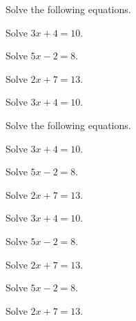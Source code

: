 \documentclass{worksheet}
\begin{document}
\begin{linebreak}
\end{linebreak}

\begin{question}
    Solve the following equations.
    \begin{parts}
        \begin{questionpart}
            Solve \(3x+4=10\).
        \end{questionpart}
        \begin{questionpart}
            Solve \(5x-2=8\).
        \end{questionpart}
        \begin{questionpart}
            Solve \(2x+7=13\).
        \end{questionpart}
        \begin{questionpart}
            Solve \(3x+4=10\).
        \end{questionpart}
    \end{parts}
\end{question}

\begin{pagebreak}
\end{pagebreak}

\begin{question}
    Solve the following equations.
    \begin{parts}[columns=3]
        \begin{questionpart}
            Solve \(3x+4=10\).
        \end{questionpart}
        \begin{questionpart}
            Solve \(5x-2=8\).
        \end{questionpart}
        \begin{questionpart}
            Solve \(2x+7=13\).
        \end{questionpart}
        \begin{questionpart}
            Solve \(3x+4=10\).
        \end{questionpart}
        \begin{questionpart}
            Solve \(5x-2=8\).
        \end{questionpart}
        \begin{questionpart}
            Solve \(2x+7=13\).
        \end{questionpart}
        \begin{questionpart}
            Solve \(5x-2=8\).
        \end{questionpart}
        \begin{questionpart}
            Solve \(2x+7=13\).
        \end{questionpart}
    \end{parts}
\end{question}
\end{document}
